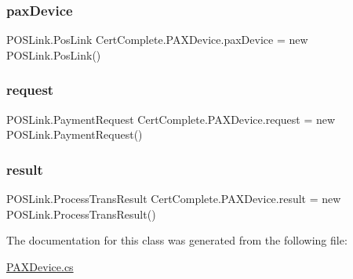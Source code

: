 \subsubsection{\texorpdfstring{pax\+Device}{paxDevice}}
{\footnotesize\ttfamily P\+O\+S\+Link.\+Pos\+Link Cert\+Complete.\+P\+A\+X\+Device.\+pax\+Device = new P\+O\+S\+Link.\+Pos\+Link()\hspace{0.3cm}{\ttfamily [private]}}

\mbox{\label{class_cert_complete_1_1_p_a_x_device_a101e6e34494845a82d2834c79fce5554}} 
\subsubsection{\texorpdfstring{request}{request}}
{\footnotesize\ttfamily P\+O\+S\+Link.\+Payment\+Request Cert\+Complete.\+P\+A\+X\+Device.\+request = new P\+O\+S\+Link.\+Payment\+Request()\hspace{0.3cm}{\ttfamily [private]}}

\mbox{\label{class_cert_complete_1_1_p_a_x_device_a71de9bbbc884a048ba0a7c99a423325c}} 
\subsubsection{\texorpdfstring{result}{result}}
{\footnotesize\ttfamily P\+O\+S\+Link.\+Process\+Trans\+Result Cert\+Complete.\+P\+A\+X\+Device.\+result = new P\+O\+S\+Link.\+Process\+Trans\+Result()\hspace{0.3cm}{\ttfamily [private]}}



The documentation for this class was generated from the following file\+:\begin{DoxyCompactItemize}
\item 
\mbox{\hyperlink{_p_a_x_device_8cs}{P\+A\+X\+Device.\+cs}}\end{DoxyCompactItemize}
